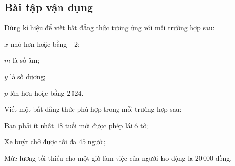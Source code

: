 \subsection{Bài tập vận dụng}
\begin{bt}
Dùng kí hiệu để viết bất đẳng thức tương ứng với mỗi trường hợp sau:
\begin{listEX}[2]
\item $x$ nhỏ hơn hoặc bằng $-2$;
\item $m$ là số âm;
\item $y$ là số dương;
\item $p$ lớn hơn hoặc bằng $2\,024$.
\end{listEX}
\end{bt}
\begin{bt}
Viết một bất đẳng thức phù hợp trong mỗi trường hợp sau:
\begin{listEX}
\item Bạn phải ít nhất $18$ tuổi mới được phép lái ô tô;
\item Xe buýt chở được tối đa $45$ người;
\item Mức lương tối thiểu cho một giờ làm việc của người lao động là 
$20\,000$ đồng.
\end{listEX}
\end{bt}
